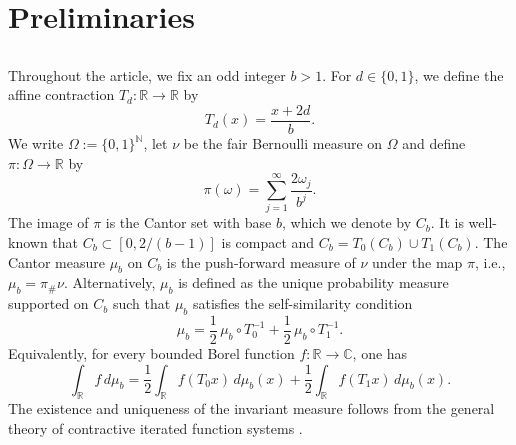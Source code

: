 \documentclass[reqno,a4paper,12pt]{amsart}
\def\N{{\mathbb N}}
\def\R{{\mathbb R}}
\def\C{{\mathbb C}}
\begin{document}
\section{Preliminaries}\label{sec:2}

\subsection{}
Throughout the article, we fix an odd integer $b > 1$. For $d\in\{0,1\}$, we define the affine contraction $T_d : \R \to \R$ by 
$$
T_d(x)=\frac{x+2d}{b}.
$$
We write $\Omega:=\{0,1\}^{\N}$, let $\nu$ be the fair Bernoulli measure on $\Omega$ and define $\pi : \Omega \to \R$ by
$$
\pi(\omega)=\sum_{j=1}^{\infty}\frac{2\omega_j}{b^j}.
$$
The image of $\pi$ is the Cantor set with base $b$, which we denote by $C_b$. It is well-known that $C_b \subset [0,2/(b-1)]$ is compact and $C_b = T_0(C_b) \cup T_1(C_b)$. The Cantor measure $\mu_b$ on $C_b$ is the push-forward measure of $\nu$ under the map $\pi$, i.e., $\mu_b = \pi_{\#}\nu$. Alternatively, $\mu_b$ is defined as the unique probability measure supported on $C_b$ such that $\mu_b$ satisfies the self-similarity condition
\begin{equation}\label{eq:self-similar}
        \mu_b=\frac12\,\mu_b\circ T_0^{-1}
             +\frac12\,\mu_b\circ T_1^{-1}.
\end{equation}
Equivalently, for every bounded Borel function $f:\R\to\C$, one has
\begin{equation}\label{eq:self-similar-integral}
        \int_{\R}f\,d\mu_b
        =
        \frac12\int_{\R}f(T_0x)\,d\mu_b(x)
        +
        \frac12\int_{\R}f(T_1x)\,d\mu_b(x).
\end{equation}
The existence and uniqueness of the invariant measure follows from the general theory of contractive iterated function systems \cite{hutchinson1981fractals}.
\end{document}
